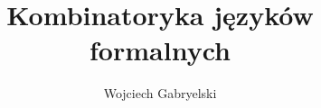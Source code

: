 \documentclass[inzynier,druk]{dyplom}
\author{Wojciech Gabryelski}
\title{Kombinatoryka języków formalnych}
\begin{document}
\maketitle

\tableofcontents













\appendixpage
\appendix

\end{document}
